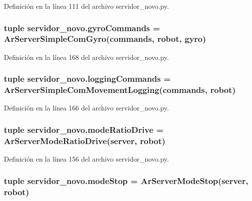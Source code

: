 Definición en la línea 111 del archivo servidor\_\-novo.py.

\hypertarget{namespaceservidor__novo_a20fff7251fe63ba8161a62b254023d04}{
\subsubsection[{gyroCommands}]{\setlength{\rightskip}{0pt plus 5cm}tuple {\bf servidor\_\-novo.gyroCommands} = ArServerSimpleComGyro({\bf commands}, {\bf robot}, {\bf gyro})}}
\label{namespaceservidor__novo_a20fff7251fe63ba8161a62b254023d04}


Definición en la línea 168 del archivo servidor\_\-novo.py.

\hypertarget{namespaceservidor__novo_a0407c97de55cf4fa7aac903f2813aa50}{
\subsubsection[{loggingCommands}]{\setlength{\rightskip}{0pt plus 5cm}tuple {\bf servidor\_\-novo.loggingCommands} = ArServerSimpleComMovementLogging({\bf commands}, {\bf robot})}}
\label{namespaceservidor__novo_a0407c97de55cf4fa7aac903f2813aa50}


Definición en la línea 166 del archivo servidor\_\-novo.py.

\hypertarget{namespaceservidor__novo_a17ac782014a1ecc8ae25509094a6812b}{
\subsubsection[{modeRatioDrive}]{\setlength{\rightskip}{0pt plus 5cm}tuple {\bf servidor\_\-novo.modeRatioDrive} = ArServerModeRatioDrive({\bf server}, {\bf robot})}}
\label{namespaceservidor__novo_a17ac782014a1ecc8ae25509094a6812b}


Definición en la línea 156 del archivo servidor\_\-novo.py.

\hypertarget{namespaceservidor__novo_a63f8dd02ccddbc7be4de022c23246578}{
\subsubsection[{modeStop}]{\setlength{\rightskip}{0pt plus 5cm}tuple {\bf servidor\_\-novo.modeStop} = ArServerModeStop({\bf server}, {\bf robot})}}
\label{namespaceservidor__novo_a63f8dd02ccddbc7be4de022c23246578}


